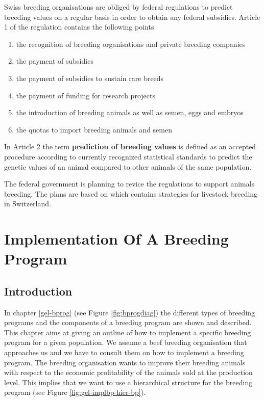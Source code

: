 \documentclass[
]{book}
\providecommand{\tightlist}{%
  \setlength{\itemsep}{0pt}\setlength{\parskip}{0pt}}
\begin{document}
Swiss breeding organisations are obliged by federal regulations \citep{Bundesrat2012} to predict breeding values on a regular basis in order to obtain any federal subsidies. Article 1 of the regulation contains the following points

\begin{enumerate}
\def\labelenumi{\alph{enumi}.}
\tightlist
\item
  the recognition of breeding organisations and private breeding companies
\item
  the payment of subsidies
\item
  the payment of subsidies to sustain rare breeds
\item
  the payment of funding for research projects
\item
  the introduction of breeding animals as well as semen, eggs and embryos
\item
  the quotas to import breeding animals and semen
\end{enumerate}

In Article 2 the term \textbf{prediction of breeding values} is defined as an accepted procedure according to currently recognized statistical standards to predict the genetic values of an animal compared to other animals of the same population.

The federal government is planning to revice the regulations to support animals breeding. The plans are based on \citep{Lehmann2018} which contains strategies for livestock breeding in Switzerland.

\hypertarget{gel-implbp}{%
\chapter{Implementation Of A Breeding Program}\label{gel-implbp}}

\hypertarget{gel-implbp-intro}{%
\section{Introduction}\label{gel-implbp-intro}}

In chapter \ref{gel-bprog} (see Figure \ref{fig:bprogdiag}) the different types of breeding programs and the components of a breeding program are shown and described. This chapter aims at giving an outline of how to implement a specific breeding program for a given population. We assume a beef breeding organisation that approaches us and we have to consult them on how to implement a breeding program. The breeding organisation wants to improve their breeding animals with respect to the economic profitability of the animals sold at the production level. This implies that we want to use a hierarchical structure for the breeding program (see Figure \ref{fig:gel-implbp-hier-bp}).
\end{document}
